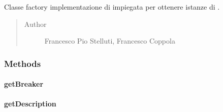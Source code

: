 \documentclass[letterpaper,10pt,italian,openany,oneside]{sphinxmanual}
\begin{document}
\begin{fulllineitems}
\label{\detokenize{source/it/unicam/cs/pa/mastermind/factories/DonaldKnuthBreakerFactory:it.unicam.cs.pa.mastermind.factories.DonaldKnuthBreakerFactory}}
Classe factory implementazione di  impiegata per ottenere istanze di .
\begin{quote}\begin{description}
\item[{Author}] \leavevmode
Francesco Pio Stelluti, Francesco Coppola

\end{description}\end{quote}

\end{fulllineitems}



\subsubsection{Methods}
\label{\detokenize{source/it/unicam/cs/pa/mastermind/factories/DonaldKnuthBreakerFactory:methods}}

\paragraph{getBreaker}
\label{\detokenize{source/it/unicam/cs/pa/mastermind/factories/DonaldKnuthBreakerFactory:getbreaker}}

\begin{fulllineitems}
\label{\detokenize{source/it/unicam/cs/pa/mastermind/factories/DonaldKnuthBreakerFactory:it.unicam.cs.pa.mastermind.factories.DonaldKnuthBreakerFactory.getBreaker(GameView, int, int)}}
\end{fulllineitems}



\paragraph{getDescription}
\label{\detokenize{source/it/unicam/cs/pa/mastermind/factories/DonaldKnuthBreakerFactory:getdescription}}
\end{document}
